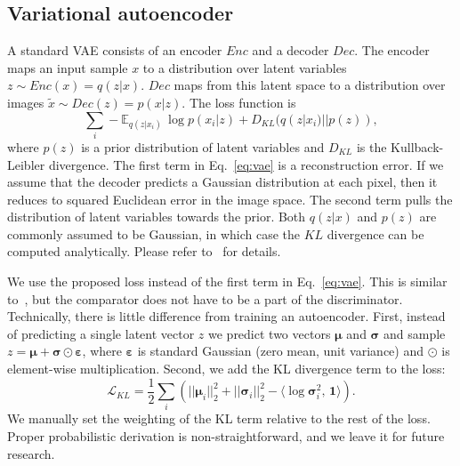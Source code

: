 \documentclass{article}
\newcommand{\TODO}[1]{{\color{dblue}[TODO #1]}}
\newcommand{\loss}{\mathcal{L}}
\newcommand{\klloss}{\loss_{KL}}
\newcommand{\enc}{Enc}
\newcommand{\dec}{Dec}
\newcommand{\vaein}{x}
\newcommand{\vaerec}{\tilde{\vaein}}
\newcommand{\latent}{z}
\newcommand{\expect}{\mathbb{E}}
\newcommand{\kldiv}{D_{KL}}
\newcommand{\vaemean}{\mathbf{\mu}}
\newcommand{\vaesigma}{\mathbf{\sigma}}
\newcommand{\vaenoise}{\mathbf{\varepsilon}}
\begin{document}
\subsection{Variational autoencoder} \label{sec:exp_vae}
A standard VAE consists of an encoder $\enc$ and a decoder $\dec$.
The encoder maps an input sample $\vaein$ to a distribution over latent variables $\latent \sim \enc(\vaein) = q(\latent|\vaein)$.
$\dec$ maps from this latent space to a distribution over images $\vaerec \sim \dec(\latent) = p(\vaein|\latent)$.
The loss function is 
\begin{equation}\label{eq:vae}
\sum\limits_i -\expect_{q(\latent|\vaein_i)}\, \log p(\vaein_i|\latent) + \kldiv (q(\latent| \vaein_i) || p(\latent)),
\end{equation}
where $p(\latent)$ is a prior distribution of latent variables and $\kldiv$ is the Kullback-Leibler divergence.
The first term in Eq.~\ref{eq:vae} is a reconstruction error.
If we assume that the decoder predicts a Gaussian distribution at each pixel, then it reduces to squared Euclidean error in the image space.
The second term pulls the distribution of latent variables towards the prior.
Both $q(\latent|\vaein)$ and $p(\latent)$ are commonly assumed to be Gaussian, in which case the $KL$ divergence can be computed analytically.
Please refer to~\citet{Kingma_NIPS2014} for details.

We use the proposed loss instead of the first term in Eq.~\ref{eq:vae}.
This is similar to~\citet{Larsen_arxiv2015}, but the comparator does not have to be a part of the discriminator.
Technically, there is little difference from training an autoencoder.
First, instead of predicting a single latent vector $z$ we predict two vectors $\vaemean$ and $\vaesigma$ and sample $z = \vaemean + \vaesigma \odot \vaenoise$, where $\vaenoise$ is standard Gaussian (zero mean, unit variance) and $\odot$ is element-wise multiplication.
Second, we add the KL divergence term to the loss:
\begin{equation}
 \klloss = \frac{1}{2}\sum\limits_i \left(||\vaemean_i||_2^2   + ||\vaesigma_i||^2_2 - \langle \log \vaesigma_i^2, \, \textbf{1} \rangle \right) .
\end{equation}
We manually set the weighting of the KL term relative to the rest of the loss. 
Proper probabilistic derivation is non-straightforward, and we leave it for future research.
\end{document}
